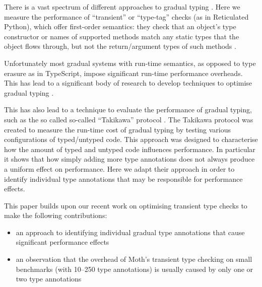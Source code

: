 \documentclass[sigplan,screen]{acmart}
\begin{document}
There is a vast spectrum of different approaches to gradual typing \cite{kafka18,bensurvey18icfp}. Here we measure the performance of ``transient'' or ``type-tag'' checks (as in Reticulated Python), which offer first-order semantics: they check that an object's type constructor or names of supported methods match any static types that the object flows through, but not the return/argument types of such methods \cite{Siek2007,Bloom2009,concrete15,reticPython2014,Greenman2018}.

Unfortunately most gradual systems with run-time semantics, as opposed to type erasure as in TypeScript, impose significant run-time performance overheads. This has lead to a significant body of research to develop techniques to optimise gradual typing \citep{Vitousek2017,Muehlboeck2017,Bauman2017,Richards2017,Greenman2018}.

This has also lead to a technique to evaluate the performance of gradual typing, such as the so called so-called ``Takikawa'' protocol \cite{Takikawa2016,Greenman2019jfp,vitousek-transient-arXive-2019}. The Takikawa protocol was created to measure the run-time cost of gradual typing by testing various configurations of typed/untyped code. This approach was designed to characterise how the amount of typed and untyped code influences performance.
In particular it shows that how simply adding more type annotations does not always produce a uniform effect on performance. Here we adapt their approach in order to identify individual type annotations that may be responsible for performance effects.

This paper builds upon our recent work on optimising transient type checks \cite{Roberts2017,roberts-and-co-ecoop-2019} to make the following contributions:
\begin{itemize}
  \item an approach to identifying individual gradual type annotations
        that cause significant performance effects
  \item an observation that the overhead of Moth's transient type checking on small benchmarks (with 10--250 type annotations) is usually caused by only one or two type annotations
\end{itemize}
\end{document}
